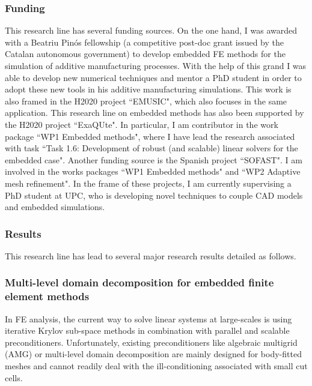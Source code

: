 \documentclass{article}
\begin{document}
\subsubsection{Funding}

This research line has several funding sources. On the one hand, I was awarded with a Beatriu Pinós fellowship (a competitive post-doc grant issued by the Catalan autonomous government) to develop embedded FE methods for the simulation of additive manufacturing processes. With the help of this grand I was able to develop new numerical techniques and mentor a PhD student in order to adopt these new tools in his additive manufacturing simulations. This work is also framed in the  H2020 project ``EMUSIC", which also focuses in the same application.  This research line  on embedded methods has also been supported by the  H2020 project ``ExaQUte". In particular, I am contributor in the work package ``WP1 Embedded methods", where I have lead the research associated with task ``Task 1.6: Development of robust (and scalable) linear solvers for the embedded case". Another funding source is the Spanish project  ``SOFAST".  I am involved in the works packages ``WP1 Embedded methods" and ``WP2 Adaptive mesh refinement". In the frame of these projects, I am currently supervising a PhD student at UPC, who is developing novel techniques to couple CAD models and embedded simulations.


\subsubsection{Results}

This research line has lead to several major research results detailed as follows.

\subsubsection{Multi-level domain decomposition for embedded finite element methods} \label{sec:unf-BDDC}

In FE analysis, the current way to solve linear systems at large-scales is using iterative Krylov sub-space methods in combination with parallel and scalable preconditioners. Unfortunately, existing preconditioners like algebraic multigrid (AMG) \cite{briggs_2000} or multi-level domain decomposition \cite{toselli_2005} are mainly designed for body-fitted meshes and cannot readily deal with the ill-conditioning associated with small cut cells. 
\end{document}
